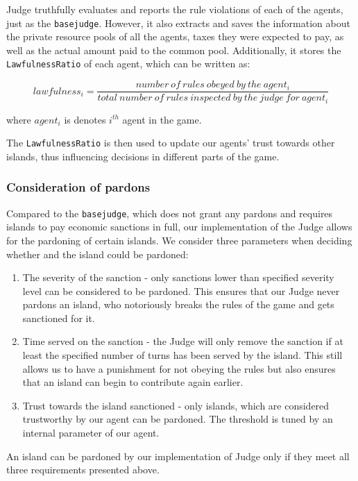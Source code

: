 Judge truthfully evaluates and reports the rule violations of each of the agents, just as the \texttt{basejudge}. However, it also extracts and saves the information about the private resource pools of all the agents, taxes they were expected to pay, as well as the actual amount paid to the common pool. Additionally, it stores the \texttt{LawfulnessRatio} of each agent, which can be written as:


\begin{equation}
    lawfulness_{i} = \frac{number\:of\:rules\:obeyed\:by\:the\:agent_{i}}{total\:number\:of\:rules\:inspected\:by\:the\:judge\:for\:agent_{i}}
\end{equation}

where $agent_{i}$ is denotes $i^{th}$ agent in the game.  

The \texttt{LawfulnessRatio} is then used to update our agents' trust towards other islands, thus influencing decisions in different parts of the game. 

\subsubsection{Consideration of pardons}
Compared to the \texttt{basejudge}, which does not grant any pardons and requires islands to pay economic sanctions in full, our implementation of the Judge allows for the pardoning of certain islands. We consider three parameters when deciding whether and the island could be pardoned:

\begin{enumerate}
    \item The severity of the sanction - only sanctions lower than specified severity level can be considered to be pardoned. This ensures that our Judge never pardons an island, who notoriously breaks the rules of the game and gets sanctioned for it.
    \item Time served on the sanction - the Judge will only remove the sanction if at least the specified number of turns has been served by the island. This still allows us to have a punishment for not obeying the rules but also ensures that an island can begin to contribute again earlier.
    \item Trust towards the island sanctioned - only islands, which are considered trustworthy by our agent can be pardoned. The threshold is tuned by an internal parameter of our agent.
\end{enumerate}

An island can be pardoned by our implementation of Judge only if they meet all three requirements presented above. 


